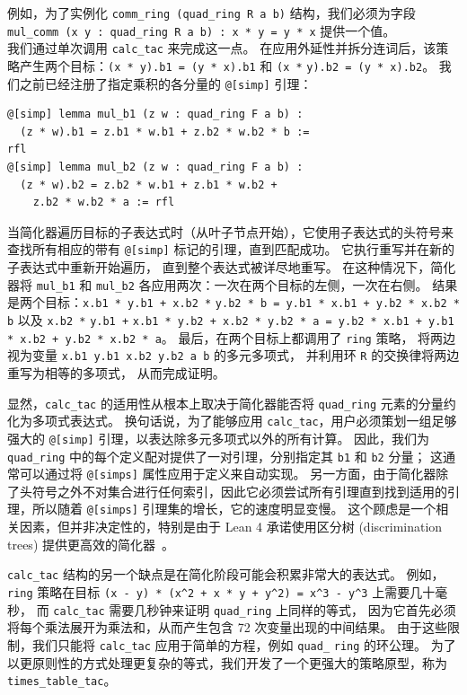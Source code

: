 \documentclass[sigplan,10pt,nonacm,
screen]{acmart} \settopmatter{printfolios=true,printccs=false,printacmref=false}
\begin{document}
例如，为了实例化 \lstinline{comm_ring (quad_ring R a b)} 结构，我们必须为字段 \lstinline{mul_comm (x y : quad_ring R a b) : x * y = y * x} 提供一个值。\\
我们通过单次调用 \lstinline{calc_tac} 来完成这一点。
在应用外延性并拆分连词后，该策略产生两个目标：\lstinline{(x * y).b1 = (y * x).b1} 和 \lstinline{(x *} \lstinline{y).b2 = (y * x).b2}。 %
我们之前已经注册了指定乘积的各分量的 \lstinline{@[simp]} 引理：
\begin{lstlisting}
@[simp] lemma mul_b1 (z w : quad_ring F a b) :
  (z * w).b1 = z.b1 * w.b1 + z.b2 * w.b2 * b :=
rfl
@[simp] lemma mul_b2 (z w : quad_ring F a b) :
  (z * w).b2 = z.b2 * w.b1 + z.b1 * w.b2 +
    z.b2 * w.b2 * a := rfl
\end{lstlisting}
当简化器遍历目标的子表达式时（从叶子节点开始），它使用子表达式的头符号来查找所有相应的带有 \lstinline{@[simp]} 标记的引理，直到匹配成功。
它执行重写并在新的子表达式中重新开始遍历，
直到整个表达式被详尽地重写。
在这种情况下，简化器将 \lstinline{mul_b1} 和 \lstinline{mul_b2} 各应用两次：一次在两个目标的左侧，一次在右侧。
结果是两个目标：\lstinline{x.b1 * y.b1 + x.b2 *} %
\lstinline{y.b2 * b = y.b1 * x.b1 + y.b2 * x.b2 * b} 以及 \lstinline{x.b2 *} \lstinline{y.b1 +} %
\lstinline{x.b1 * y.b2 + x.b2 * y.b2 * a = y.b2 * x.b1 + y.b1 * x.b2 + y.b2 * x.b2 * a}。
最后，在两个目标上都调用了 \lstinline{ring} 策略，
将两边视为变量 \lstinline{x.b1 y.b1 x.b2 y.b2 a b} 的多元多项式，
并利用环 \lstinline{R} 的交换律将两边重写为相等的多项式，
从而完成证明。

显然，\lstinline{calc_tac} 的适用性从根本上取决于简化器能否将 \lstinline{quad_ring} 元素的分量约化为多项式表达式。
换句话说，为了能够应用 \lstinline{calc_tac}，用户必须策划一组足够强大的 \lstinline{@[simp]} 引理，以表达除多元多项式以外的所有计算。
因此，我们为 \lstinline{quad_ring} 中的每个定义配对提供了一对引理，分别指定其 \lstinline{b1} 和 \lstinline{b2} 分量；
这通常可以通过将 \lstinline{@[simps]} 属性应用于定义来自动实现。
另一方面，由于简化器除了头符号之外不对集合进行任何索引，因此它必须尝试所有引理直到找到适用的引理，所以随着 \lstinline{@[simps]} 引理集的增长，它的速度明显变慢。
这个顾虑是一个相关因素，但并非决定性的，特别是由于 Lean 4 承诺使用区分树 (discrimination trees) 提供更高效的简化器~\cite{lean-4}。

\lstinline{calc_tac} 结构的另一个缺点是在简化阶段可能会积累非常大的表达式。
例如，\lstinline{ring} 策略在目标 \lstinline{(x - y) * (x^2 + x * y + y^2) = x^3 - y^3} 上需要几十毫秒，
而 \lstinline{calc_tac} 需要几秒钟来证明 \lstinline{quad_ring} 上同样的等式，
因为它首先必须将每个乘法展开为乘法和，从而产生包含 72 次变量出现的中间结果。
由于这些限制，我们只能将 \lstinline{calc_tac} 应用于简单的方程，例如 \lstinline{quad_}\- %
\lstinline{ring} 的环公理。
为了以更原则性的方式处理更复杂的等式，我们开发了一个更强大的策略原型，称为 \lstinline{times_table_tac}。
\end{document}
